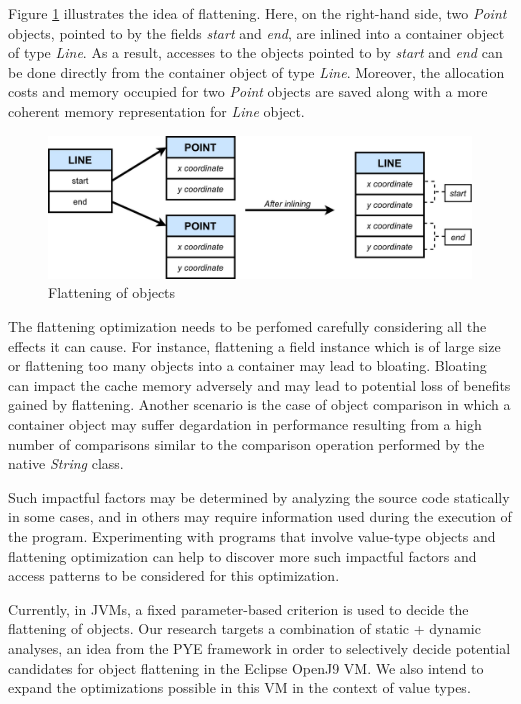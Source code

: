 \documentclass[12 pt, a4paper]{article}
\begin{document}
Figure \ref{fig:Figure 1} illustrates the idea of flattening. 
Here, on the right-hand side, two {\em Point} objects, pointed to by 
the fields {\em start} and {\em end}, are inlined into a container object 
of type \textit{Line}.
As a result, accesses to the objects pointed to by {\em start} and {\em end} 
can be done directly from the container object of type {\em Line}. Moreover, 
the allocation costs and memory occupied for two {\em Point} objects are saved along
with a more coherent memory representation for {\em Line} object.

\begin{figure}[H]
	\vskip 0.2cm
	\centering
	\includegraphics[scale=0.2]{Images/Flattening_Line.jpg}
	\caption{Flattening of objects}
	\label{fig:Figure 1}
\end{figure}
The flattening optimization needs to be perfomed carefully considering all the effects it can cause. 
For instance, flattening a field instance which is of large size or flattening too many objects into a 
container may lead to bloating. Bloating can impact the cache memory adversely and may 
lead to potential loss of benefits gained by flattening. Another scenario is the case of object 
comparison in which a container object may suffer degardation in performance resulting 
from a high number of comparisons similar to the comparison operation performed by the native {\em String} class. 


	Such impactful factors may be determined by analyzing the source code statically in some cases, and in others may require 
information used during the execution of the program. Experimenting with programs that involve 
value-type objects and flattening optimization 
can help to discover more such impactful factors and access patterns to be considered for this 
optimization. 

Currently, in JVMs, a fixed parameter-based criterion is used to decide the flattening of objects.
Our research targets a combination of static + dynamic analyses, an idea from the PYE framework \citep{PYE2019} in 
order to selectively decide potential candidates for object flattening in the Eclipse OpenJ9 VM.
 We also intend to expand the optimizations 
possible in this VM in the context of value types. 
\end{document}
